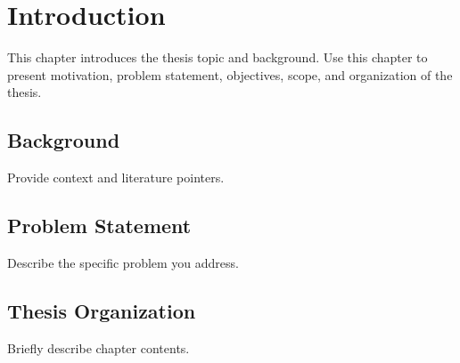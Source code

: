 \chapter{Introduction}
\label{ch:intro}

This chapter introduces the thesis topic and background. Use this chapter to present motivation, problem statement, objectives, scope, and organization of the thesis.

\section{Background}
Provide context and literature pointers.

\section{Problem Statement}
Describe the specific problem you address.

\section{Thesis Organization}
Briefly describe chapter contents.
